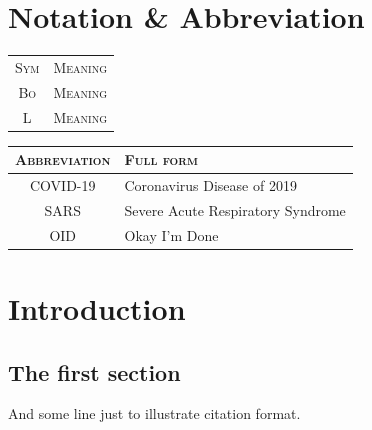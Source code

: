 \documentclass[a4paper, oneside, 11pt]{book}
\begin{document}
\chapter*{Notation \& Abbreviation}
\begin{center}
\begin{tabular}{| c | l |}
\hline
	\textsc{Sym} & \textsc{Meaning}\\
	\textsc{Bo} & \textsc{Meaning}\\
	\textsc{L} & \textsc{Meaning}\\
	\hline\hline

\end{tabular}
\end{center}

\begin{center}
\begin{tabular}{| c | l |}
\hline
	\textsc{Abbreviation} & \textsc{Full form}\\
	\hline\hline
  COVID-19 & Coronavirus Disease of 2019 \\
  SARS & Severe Acute Respiratory Syndrome \\
  OID & Okay I'm Done \\
  \hline
	\end{tabular}
\end{center}

{
\hypersetup{linkcolor=black}
\begin{singlespace}
\newpage\tableofcontents
\newpage\listoffigures
\newpage\listoftables
\end{singlespace}
}


\newpage
{}
\mainmatter

\chapter{Introduction}
\label{ch:intro}

\section{The first section}
\label{sec:firstone}
\lipsum[1] And some line just to illustrate citation \supercite{example} format.
\end{document}

